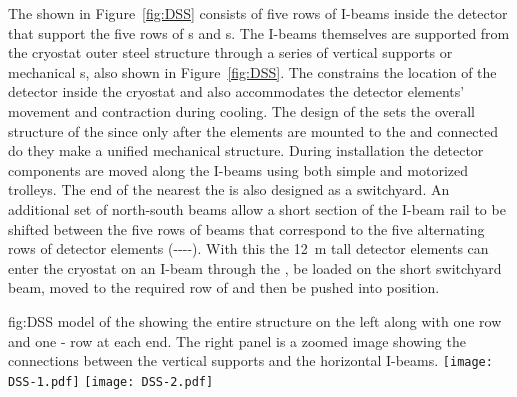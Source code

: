 The  shown in Figure~\ref{fig:DSS} consists of five rows of I-beams inside the detector that support the five rows of s and s. 
The I-beams themselves are supported from the cryostat outer steel structure through a series of vertical supports or mechanical \fdth{}s, also shown in Figure~\ref{fig:DSS}. 
The  constrains the location of the detector inside the cryostat and also accommodates the detector elements' movement and contraction during cooling. The design of the  sets the overall structure of the  since only after the elements are mounted to the  and connected do they make a unified mechanical structure. 
During installation the detector components are moved along the I-beams using both simple and motorized trolleys. 
The end of the  nearest the  is also designed as a switchyard. An additional set of north-south beams allow a short section of the I-beam rail to be shifted between the five rows of  beams that correspond to the five alternating rows of detector elements  (----).  
With this the \SI{12}{m} tall detector elements can enter the cryostat on an I-beam through the , be loaded on the short switchyard beam, moved to the required row of  and then be pushed into position. 

\begin{dunefigure} {fig:DSS}
  {\threed model of the  showing the entire
  structure on the left along with one  row and one
  - row at each end. The right panel is a zoomed image
  showing the connections between the vertical supports and the
  horizontal I-beams.}
\texttt{[image: DSS-1.pdf]}
 \texttt{[image: DSS-2.pdf]}
\end{dunefigure}




